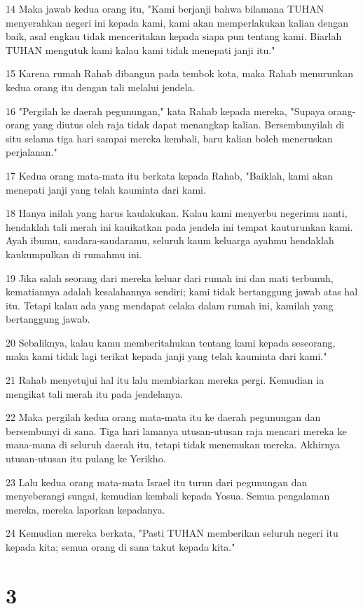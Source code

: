 \par 14 Maka jawab kedua orang itu, "Kami berjanji bahwa bilamana TUHAN menyerahkan negeri ini kepada kami, kami akan memperlakukan kalian dengan baik, asal engkau tidak menceritakan kepada siapa pun tentang kami. Biarlah TUHAN mengutuk kami kalau kami tidak menepati janji itu."
\par 15 Karena rumah Rahab dibangun pada tembok kota, maka Rahab menurunkan kedua orang itu dengan tali melalui jendela.
\par 16 "Pergilah ke daerah pegunungan," kata Rahab kepada mereka, "Supaya orang-orang yang diutus oleh raja tidak dapat menangkap kalian. Bersembunyilah di situ selama tiga hari sampai mereka kembali, baru kalian boleh meneruskan perjalanan."
\par 17 Kedua orang mata-mata itu berkata kepada Rahab, "Baiklah, kami akan menepati janji yang telah kauminta dari kami.
\par 18 Hanya inilah yang harus kaulakukan. Kalau kami menyerbu negerimu nanti, hendaklah tali merah ini kauikatkan pada jendela ini tempat kauturunkan kami. Ayah ibumu, saudara-saudaramu, seluruh kaum keluarga ayahmu hendaklah kaukumpulkan di rumahmu ini.
\par 19 Jika salah seorang dari mereka keluar dari rumah ini dan mati terbunuh, kematiannya adalah kesalahannya sendiri; kami tidak bertanggung jawab atas hal itu. Tetapi kalau ada yang mendapat celaka dalam rumah ini, kamilah yang bertanggung jawab.
\par 20 Sebaliknya, kalau kamu memberitahukan tentang kami kepada seseorang, maka kami tidak lagi terikat kepada janji yang telah kauminta dari kami."
\par 21 Rahab menyetujui hal itu lalu membiarkan mereka pergi. Kemudian ia mengikat tali merah itu pada jendelanya.
\par 22 Maka pergilah kedua orang mata-mata itu ke daerah pegunungan dan bersembunyi di sana. Tiga hari lamanya utusan-utusan raja mencari mereka ke mana-mana di seluruh daerah itu, tetapi tidak menemukan mereka. Akhirnya utusan-utusan itu pulang ke Yerikho.
\par 23 Lalu kedua orang mata-mata Israel itu turun dari pegunungan dan menyeberangi sungai, kemudian kembali kepada Yosua. Semua pengalaman mereka, mereka laporkan kepadanya.
\par 24 Kemudian mereka berkata, "Pasti TUHAN memberikan seluruh negeri itu kepada kita; semua orang di sana takut kepada kita."

\chapter{3}

